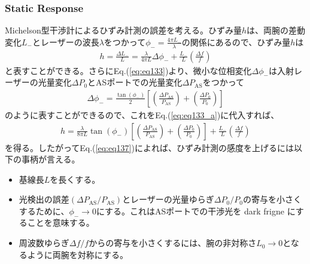 \subsubsection{Static Response} 
Michelson型干渉計によるひずみ計測の誤差を考える。ひずみ量$h$は、両腕の差動変化$L_{-}$とレーザーの波長$\lambda$をつかって$\phi_{-}=\frac{4\pi{L_{-}}}{\lambda}$の関係にあるので、ひずみ量$h$は
\begin{eqnarray}
  h = \frac{\Delta{L_{-}}}{L} = \frac{\lambda}{4\pi{L}}\Delta{\phi_{-}} + \frac{L_{-}}{L}\left(\frac{\Delta{f}}{f}\right) \label{eq:eq133_a}
\end{eqnarray}
と表すことができる。さらにEq.(\ref{eq:eq133})より、微小な位相変化$\Delta{\phi_{-}}$は入射レーザーの光量変化$\Delta{P_0}$とASポートでの光量変化$\Delta{P_{\mathrm{AS}}}$をつかって
\begin{eqnarray}
  \Delta{\phi_{-}} = \frac{\tan{(\phi_{-})}}{2} \left[\left(\frac{\Delta P_{\mathrm{AS}}}{P_{\mathrm{AS}}}\right) + \left(\frac{\Delta{P_0}}{P_0}\right) \right] 
\end{eqnarray}
のように表すことができるので、これをEq.(\ref{eq:eq133_a})に代入すれば、
\begin{eqnarray}
  h = \frac{\lambda}{8\pi{L}}\tan{(\phi_{-})} \left[\left(\frac{\Delta P_{\mathrm{AS}}}{P_{\mathrm{AS}}}\right) + \left(\frac{\Delta{P_0}}{P_0}\right) \right] + \frac{L_{-}}{L}\left(\frac{\Delta{f}}{f}\right) \label{eq:eq137}
\end{eqnarray} 
を得る。したがってEq.(\ref{eq:eq137})によれば、ひずみ計測の感度を上げるには以下の事柄が言える。
\begin{itemize}
  \setlength{\itemsep}{1pt}      %
  \setlength{\parskip}{-1pt}     %
  \setlength{\itemindent}{0pt}   %
  \setlength{\labelsep}{5pt}     %
\item 基線長$L$を長くする。
\item 光検出の誤差$(\Delta P_{\mathrm{AS}}/P_{\mathrm{AS}})$とレーザーの光量ゆらぎ$\Delta{P_0}/P_0$の寄与を小さくするために、$\phi_{-}\to0$にする。これはASポートでの干渉光を dark frigne にすることを意味する。
\item 周波数ゆらぎ$\Delta{f}/f$からの寄与を小さくするには、腕の非対称さ$L_{0}\to0$となるように両腕を対称にする。
\end{itemize}


